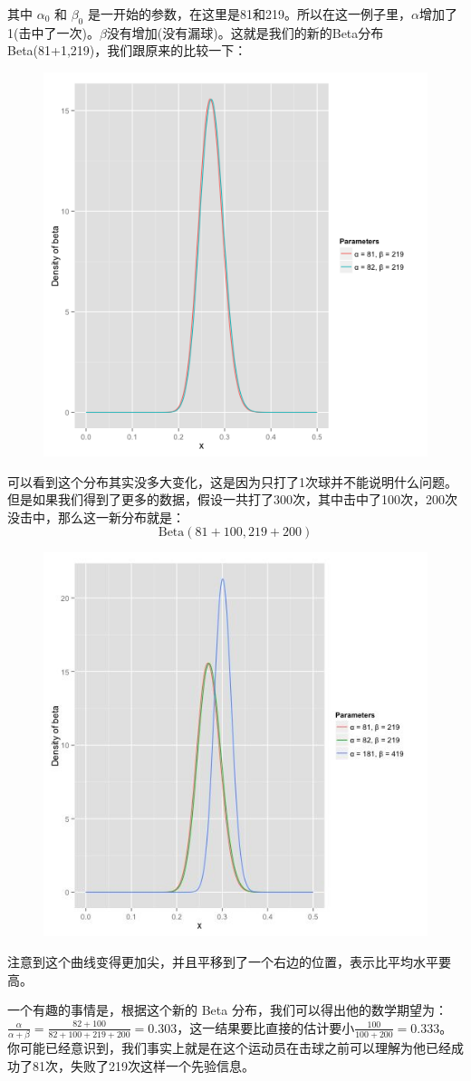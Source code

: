 \documentclass[12pt]{article}
\begin{document}
其中 $\alpha_0$ 和 $\beta_0$ 是一开始的参数，在这里是81和219。所以在这一例子里，$\alpha$增加了1(击中了一次)。$\beta$没有增加(没有漏球)。这就是我们的新的Beta分布 Beta(81+1,219)，我们跟原来的比较一下：
\begin{figure}[H]
  \centering
  \includegraphics[width=.5\textwidth]{fig/Beta_Distribution_Example_2.png} 
\end{figure}

可以看到这个分布其实没多大变化，这是因为只打了1次球并不能说明什么问题。但是如果我们得到了更多的数据，假设一共打了300次，其中击中了100次，200次没击中，那么这一新分布就是：
$$
\text{Beta}(81+100, 219+200)
$$
\begin{figure}[H]
  \centering
  \includegraphics[width=.5\textwidth]{fig/Beta_Distribution_Example_3.jpg} 
\end{figure}

注意到这个曲线变得更加尖，并且平移到了一个右边的位置，表示比平均水平要高。

一个有趣的事情是，根据这个新的 Beta 分布，我们可以得出他的数学期望为：$\frac{\alpha}{\alpha+\beta} = \frac{82+100}{82+100+219+200} = 0.303$，这一结果要比直接的估计要小$\frac{100}{100+200}=0.333$。你可能已经意识到，我们事实上就是在这个运动员在击球之前可以理解为他已经成功了81次，失败了219次这样一个先验信息。
\end{document}
